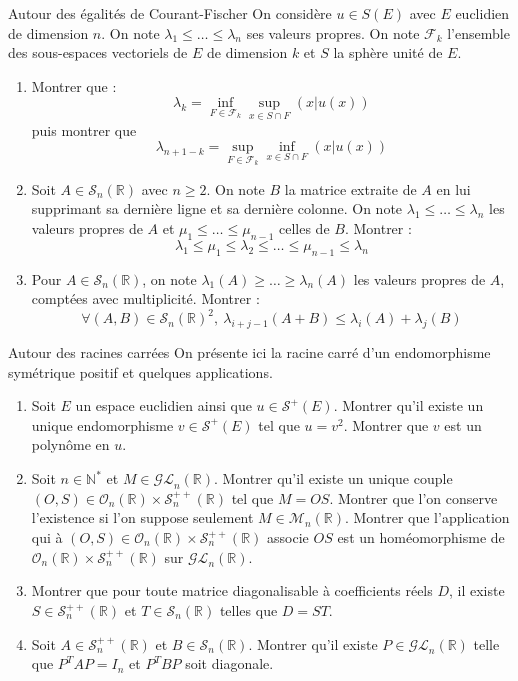 \documentclass[french]{book}
\newcommand{\N}{\mathbb{N}}
\newcommand{\R}{\mathbb{R}}
\newcommand{\st}{^*}
\theoremstyle{definition}
\theoremstyle{remark}
\begin{document}
\begin{exo}[3]{Autour des égalités de Courant-Fischer}
	On considère $u\in S(E)$ avec $E$ euclidien de dimension $n$. On note $\lambda_1\leqslant\ldots\leqslant\lambda_n$ ses valeurs propres. On note $\mathcal{F}_k$ l'ensemble des sous-espaces vectoriels de $E$ de dimension $k$ et $S$ la sphère unité de $E$.
	\begin{enumerate}
		\item Montrer que : $$\lambda_k=\inf_{F\in\mathcal{F}_k}\sup_{x\in S\cap F}(x|u(x))$$ puis montrer que $$\lambda_{n+1-k}=\sup_{F\in\mathcal{F}_k}\inf_{x\in S\cap F}(x|u(x))$$
		\item Soit $A\in\mathcal{S}_n(\R)$ avec $n\geqslant 2$. On note $B$ la matrice extraite de $A$ en lui supprimant sa dernière ligne et sa dernière colonne. On note $\lambda_1\leqslant\ldots\leqslant\lambda_n$ les valeurs propres de $A$ et $\mu_1\leqslant\ldots\leqslant\mu_{n-1}$ celles de $B$. Montrer : $$\lambda_1\leqslant\mu_1\leqslant\lambda_2\leqslant\ldots\leqslant\mu_{n-1}\leqslant\lambda_n$$
		\item Pour $A\in\mathcal{S}_n(\R)$, on note $\lambda_1(A)\geqslant\ldots\geqslant\lambda_n(A)$ les valeurs propres de $A$, comptées avec multiplicité. Montrer : $$\forall (A,B)\in\mathcal{S}_n(\R)^2,\ \lambda_{i+j-1}(A+B)\leqslant\lambda_i(A)+\lambda_j(B)$$
	\end{enumerate}
\end{exo}

\begin{exo}[3]{Autour des racines carrées}
	On présente ici la racine carré d'un endomorphisme symétrique positif et quelques applications.
	\begin{enumerate}
		\item Soit $E$ un espace euclidien ainsi que $u\in\mathcal{S}^+(E)$. Montrer qu'il existe un unique endomorphisme $v\in\mathcal{S}^+(E)$ tel que $u=v^2$. Montrer que $v$ est un polynôme en $u$.
		\item Soit $n\in\N\st$ et $M\in\mathcal{GL}_n(\R)$. Montrer qu'il existe un unique couple $(O,S)\in\mathcal{O}_n(\R)\times\mathcal{S}_n^{++}(\R)$ tel que $M=OS$. Montrer que l'on conserve l'existence si l'on suppose seulement $M\in\mathcal{M}_n(\R)$. Montrer que l'application qui à $(O,S)\in\mathcal{O}_n(\R)\times\mathcal{S}_n^{++}(\R)$ associe $OS$ est un homéomorphisme de $\mathcal{O}_n(\R)\times\mathcal{S}_n^{++}(\R)$ sur $\mathcal{GL}_n(\R)$.
		\item Montrer que pour toute matrice diagonalisable à coefficients réels $D$, il existe $S\in\mathcal{S}_n^{++}(\R)$ et $T\in\mathcal{S}_n(\R)$ telles que $D=ST$.
		\item Soit $A\in\mathcal{S}_n^{++}(\R)$ et $B\in\mathcal{S}_n(\R)$. Montrer qu'il existe $P\in\mathcal{GL}_n(\R)$ telle que $P^TAP=I_n$ et $P^TBP$ soit diagonale.
	\end{enumerate}
\end{exo}
\end{document}
